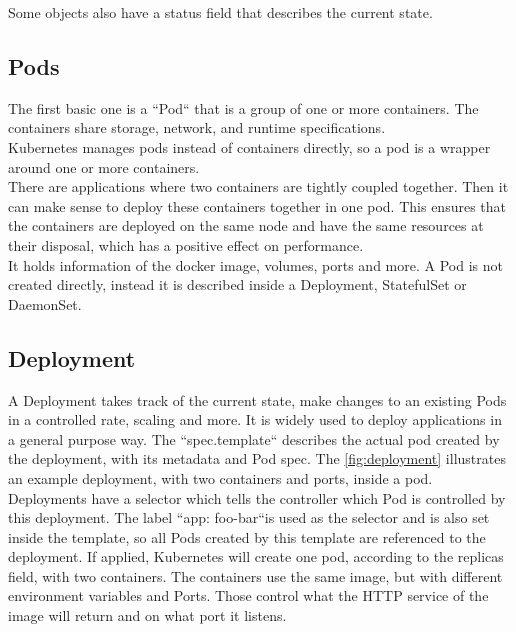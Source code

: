 Some objects also have a status field that describes the current state.~\cite{KUBERNETES-OBJECTS}

\subsection{Pods}
The first basic one is a ``Pod`` that is a group of one or more containers.
The containers share storage, network, and runtime specifications.
\\
Kubernetes manages pods instead of containers directly, so a pod is a wrapper around one or more containers.
\\
There are applications where two containers are tightly coupled together.
Then it can make sense to deploy these containers together in one pod.
This ensures that the containers are deployed on the same node and have the same resources at their disposal, which has a positive effect on performance.
\\
It holds information of the docker image, volumes, ports and more.
A Pod is not created directly, instead it is described inside a Deployment, StatefulSet or DaemonSet.~\cite{KUBERNETES-POD}

\subsection{Deployment}\label{subsec:deployment}

A Deployment takes track of the current state, make changes to an existing Pods in a controlled rate, scaling and more.
It is widely used to deploy applications in a general purpose way.
The ``spec.template`` describes the actual pod created by the deployment, with its metadata and Pod spec.
The \autoref{fig:deployment} illustrates an example deployment, with two containers and ports, inside a pod.
Deployments have a selector which tells the controller which Pod is controlled by this deployment.
The label ``app: foo-bar``is used as the selector and is also set inside the template, so all Pods created by this template are referenced to the deployment.
If applied, Kubernetes will create one pod, according to the replicas field, with two containers.
The containers use the same image, but with different environment variables and Ports.
Those control what the HTTP service of the image will return and on what port it listens.~\cite{KUBERNETES-DEPLOYMENT}


